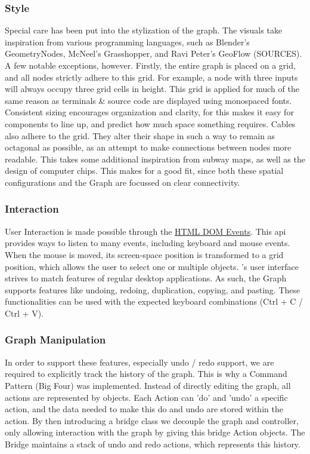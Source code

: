 \subsubsection*{ Style }
Special care has been put into the stylization of the graph.
The visuals take inspiration from various programming languages, such as Blender's GeometryNodes, McNeel's Grasshopper, and Ravi Peter's GeoFlow (SOURCES). 
A few notable exceptions, however. 
Firstly, the entire graph is placed on a grid, and all nodes strictly adhere to this grid. 
For example, a node with three inputs will always occupy three grid cells in height. 
This grid is applied for much of the same reason as terminals \& source code are displayed using monospaced fonts. 
Consistent sizing encourages organization and clarity, for this makes it easy for components to line up, and predict how much space something requires.  
Cables also adhere to the grid. They alter their shape in such a way to remain as octagonal as possible, as an attempt to make connections between nodes more readable.
This takes some additional inspiration from subway maps, as well as the design of computer chips. This makes for a good fit, since both these spatial configurations and the \geofront Graph are focussed on clear connectivity.

\subsubsection{ Interaction }
User Interaction is made possible through the \href{https://developer.mozilla.org/en-US/docs/web/api/event}{HTML DOM Events}. 
This api provides ways to listen to many events, including keyboard and mouse events. 
When the mouse is moved, its screen-space position is transformed to a grid position, which allows the user to select one or multiple objects. 
\geofront{}'s user interface strives to match features of regular desktop applications. As such, the \geofront{} Graph supports features like undoing, redoing, duplication, copying, and pasting. These functionalities can be used with the expected keyboard combinations (Ctrl + C / Ctrl + V).

\subsubsection*{ Graph Manipulation }
In order to support these features, especially undo / redo support, we are required to explicitly track the history of the graph. 
This is why a Command Pattern (Big Four) was implemented.
Instead of directly editing the graph, all actions are represented by  objects. 
Each Action can 'do' and 'undo' a specific action, and the data needed to make this do and undo are stored within the action. 
By then introducing a bridge class we decouple the graph and controller, only allowing interaction with the graph by giving this bridge Action objects. The Bridge maintains a stack of undo and redo actions, which represents this history.  


